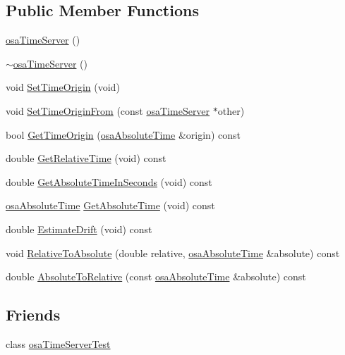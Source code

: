 \subsection*{Public Member Functions}
\begin{DoxyCompactItemize}
\item 
\hyperlink{classosa_time_server_a2025b74de2c3114ddc29187c660038e4}{osa\-Time\-Server} ()
\item 
\hyperlink{classosa_time_server_aff5e7e7d548f61b52f0892e67b302539}{$\sim$osa\-Time\-Server} ()
\item 
void \hyperlink{classosa_time_server_afac2aebe744ae87dc8666c79ce86fae3}{Set\-Time\-Origin} (void)
\item 
void \hyperlink{classosa_time_server_a02158dcb3a8e7cef7e816d53c03e1ffc}{Set\-Time\-Origin\-From} (const \hyperlink{classosa_time_server}{osa\-Time\-Server} $\ast$other)
\item 
bool \hyperlink{classosa_time_server_a8cf91b6ce8714f4b2bfa68437e182355}{Get\-Time\-Origin} (\hyperlink{structosa_absolute_time}{osa\-Absolute\-Time} \&origin) const 
\item 
double \hyperlink{classosa_time_server_a9c0a681ef88f4391d883be21ce8ed6bd}{Get\-Relative\-Time} (void) const 
\item 
double \hyperlink{classosa_time_server_a00e1277d460d21ca0c90ade821d11a84}{Get\-Absolute\-Time\-In\-Seconds} (void) const 
\item 
\hyperlink{structosa_absolute_time}{osa\-Absolute\-Time} \hyperlink{classosa_time_server_a2656918bbf5d6c4b2746d6957c0bd8fc}{Get\-Absolute\-Time} (void) const 
\item 
double \hyperlink{classosa_time_server_aabc695f2895828c46d1b2713dc668aa4}{Estimate\-Drift} (void) const 
\item 
void \hyperlink{classosa_time_server_a2cedc54dd23cb60605eb6207aea9129b}{Relative\-To\-Absolute} (double relative, \hyperlink{structosa_absolute_time}{osa\-Absolute\-Time} \&absolute) const 
\item 
double \hyperlink{classosa_time_server_a502141b5545d6cfc025d91ca3dfa5a29}{Absolute\-To\-Relative} (const \hyperlink{structosa_absolute_time}{osa\-Absolute\-Time} \&absolute) const 
\end{DoxyCompactItemize}
\subsection*{Friends}
\begin{DoxyCompactItemize}
\item 
class \hyperlink{classosa_time_server_a973e8a021d390521eba93b2dd9fcb557}{osa\-Time\-Server\-Test}
\end{DoxyCompactItemize}


